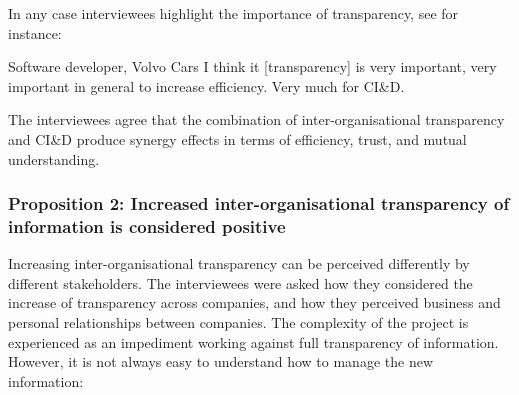In any case interviewees highlight the importance of transparency, see for instance:

\begin{aquote}{Software developer, Volvo Cars}
I think it [transparency] is very important, very important in general to increase efficiency. Very much for CI\&D. 
\end{aquote}

 The interviewees agree that the combination of inter-organisational transparency and CI\&D produce synergy effects in terms of efficiency, trust, and mutual understanding.

\vspace{.2cm}
\subsubsection{Proposition 2: Increased inter-organisational transparency of information is considered positive}

Increasing inter-organisational transparency can be perceived differently by different stakeholders. The interviewees were asked how they considered the increase of transparency across companies, and how they perceived business and personal relationships between companies. The complexity of the project is experienced as an impediment working against full transparency of information.
However, it is not always easy to understand how to manage the new information:

